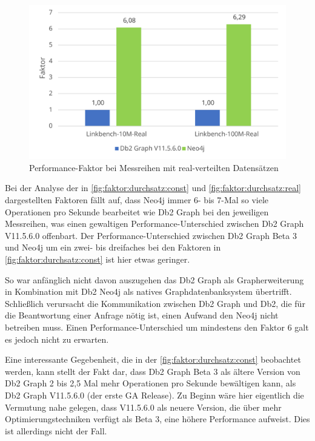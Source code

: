 \begin{figure}[!ht]
    \centering
    \includegraphics[width=\textwidth]{images/diagramme/faktor_durchschittlicher_durchsatz_real.pdf}
    \caption{Performance-Faktor bei Messreihen mit real-verteilten Datensätzen}
    \label{fig:faktor:durchsatz:real}
\end{figure}

Bei der Analyse der in \autoref{fig:faktor:durchsatz:const} und \autoref{fig:faktor:durchsatz:real} dargestellten Faktoren fällt auf, dass Neo4j immer 6- bis 7-Mal so viele Operationen pro Sekunde bearbeitet wie Db2 Graph bei den jeweiligen Messreihen, was einen gewaltigen Performance-Unterschied zwischen Db2 Graph V11.5.6.0 offenbart. Der Performance-Unterschied zwischen Db2 Graph Beta 3 und Neo4j um ein zwei- bis dreifaches bei den Faktoren in \autoref{fig:faktor:durchsatz:const} ist hier etwas geringer.

So war anfänglich nicht davon auszugehen das Db2 Graph als Grapherweiterung in Kombination mit Db2 Neo4j als natives Graphdatenbanksystem übertrifft. Schließlich verursacht die Kommunikation zwischen Db2 Graph und Db2, die für die Beantwortung einer Anfrage nötig ist, einen Aufwand den Neo4j nicht betreiben muss. Einen Performance-Unterschied um mindestens den Faktor 6 galt es jedoch nicht zu erwarten. 

Eine interessante Gegebenheit, die in der \autoref{fig:faktor:durchsatz:const} beobachtet werden, kann stellt der Fakt dar, dass Db2 Graph Beta 3 als ältere Version von Db2 Graph 2 bis 2,5 Mal mehr Operationen pro Sekunde bewältigen kann, als Db2 Graph V11.5.6.0 (der erste GA Release). Zu Beginn wäre hier eigentlich die Vermutung nahe gelegen, dass V11.5.6.0 als neuere Version, die über mehr Optimierungstechniken verfügt als Beta 3, eine höhere Performance aufweist. Dies ist allerdings nicht der Fall. 

